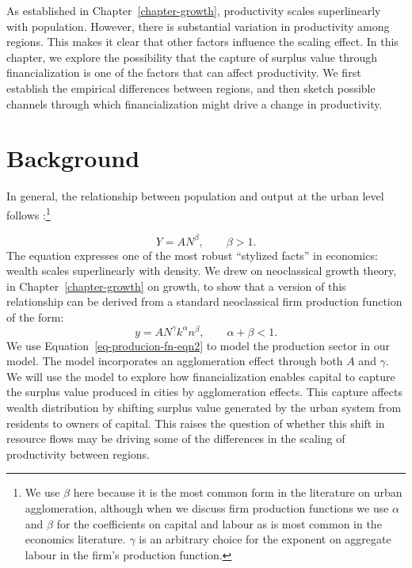 As established in Chapter~\ref{chapter-growth}, productivity scales superlinearly with population. %
However, there is substantial variation in productivity among regions.  This makes it clear that other factors influence the scaling effect. In this chapter, we explore the possibility that the capture of surplus value through financialization is one of the factors that can affect  productivity. We first establish the empirical differences between regions, and then sketch possible channels through which financialization might drive a change in productivity. 


\section{Background}\label{sec-fig-residuals}

In general, the relationship between population and output at the urban level follows \cite{loboUrbanScalingProduction2013}:\footnote{We use $\beta$ here because it is the most common form in the literature on urban agglomeration, although when we discuss firm production functions we use $\alpha$ and $\beta$ for the coefficients on capital and labour as is most common in the economics literature. $\gamma$ is an arbitrary choice for the exponent on aggregate labour in the firm's production function.}

\begin{equation}\label{eq-agglom-eqn2}
    Y=AN^\beta,\qquad \beta>1. 
\end{equation}
The equation expresses one of the most robust ``stylized facts'' in economics: wealth scales superlinearly with density.  We drew on neoclassical growth theory, in Chapter~\ref{chapter-growth} on growth, to show that a version of this relationship can be derived from a standard neoclassical firm production function of the form: 
\begin{equation}\label{eq-producion-fn-eqn2}
    y=AN^\gamma k^\alpha n^\beta,\qquad \alpha+\beta<1. 
\end{equation}
We use Equation~\ref{eq-producion-fn-eqn2} to model the production sector in our model. The model incorporates an agglomeration effect through both $A$ and $\gamma$. We will use the model to explore how financialization enables capital to capture the surplus value produced in cities by agglomeration effects. This capture affects wealth distribution by shifting surplus value generated by the urban system from residents to owners of capital. %
This raises the question of whether this shift in resource flows may be driving some of the differences in the scaling of productivity between regions.

